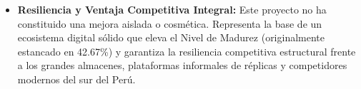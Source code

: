 \begin{itemize}
    \item \textbf{Resiliencia y Ventaja Competitiva Integral:} Este proyecto no ha constituido una mejora aislada o cosmética. Representa la base de un ecosistema digital sólido que eleva el Nivel de Madurez (originalmente estancado en 42.67\%) y garantiza la resiliencia competitiva estructural frente a los grandes almacenes, plataformas informales de réplicas y competidores modernos del sur del Perú.
\end{itemize}
